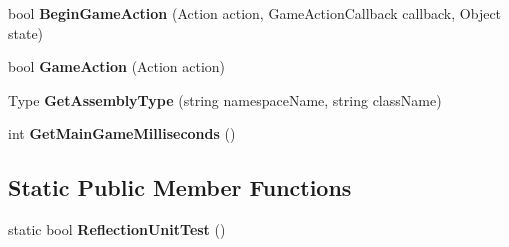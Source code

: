 \begin{DoxyCompactItemize}
\item 
\hypertarget{class_s_e_mod_a_p_i_internal_1_1_a_p_i_1_1_common_1_1_sandbox_game_assembly_wrapper_aa56ae68a14dca99d9b2aafce28ef18c2}{}bool {\bfseries Begin\+Game\+Action} (Action action, Game\+Action\+Callback callback, Object state)\label{class_s_e_mod_a_p_i_internal_1_1_a_p_i_1_1_common_1_1_sandbox_game_assembly_wrapper_aa56ae68a14dca99d9b2aafce28ef18c2}

\item 
\hypertarget{class_s_e_mod_a_p_i_internal_1_1_a_p_i_1_1_common_1_1_sandbox_game_assembly_wrapper_a29090e04998192f4edd88de83e7ea15f}{}bool {\bfseries Game\+Action} (Action action)\label{class_s_e_mod_a_p_i_internal_1_1_a_p_i_1_1_common_1_1_sandbox_game_assembly_wrapper_a29090e04998192f4edd88de83e7ea15f}

\item 
\hypertarget{class_s_e_mod_a_p_i_internal_1_1_a_p_i_1_1_common_1_1_sandbox_game_assembly_wrapper_acd1b94774b01ca0c9e6cd5db0c678cfb}{}Type {\bfseries Get\+Assembly\+Type} (string namespace\+Name, string class\+Name)\label{class_s_e_mod_a_p_i_internal_1_1_a_p_i_1_1_common_1_1_sandbox_game_assembly_wrapper_acd1b94774b01ca0c9e6cd5db0c678cfb}

\item 
\hypertarget{class_s_e_mod_a_p_i_internal_1_1_a_p_i_1_1_common_1_1_sandbox_game_assembly_wrapper_ac8b50e7d2eb82f7ff3211a25561bf294}{}int {\bfseries Get\+Main\+Game\+Milliseconds} ()\label{class_s_e_mod_a_p_i_internal_1_1_a_p_i_1_1_common_1_1_sandbox_game_assembly_wrapper_ac8b50e7d2eb82f7ff3211a25561bf294}

\end{DoxyCompactItemize}
\subsection*{Static Public Member Functions}
\begin{DoxyCompactItemize}
\item 
\hypertarget{class_s_e_mod_a_p_i_internal_1_1_a_p_i_1_1_common_1_1_sandbox_game_assembly_wrapper_ab3ac166b33d7ee9280c5ac891e1e41e4}{}static bool {\bfseries Reflection\+Unit\+Test} ()\label{class_s_e_mod_a_p_i_internal_1_1_a_p_i_1_1_common_1_1_sandbox_game_assembly_wrapper_ab3ac166b33d7ee9280c5ac891e1e41e4}

\end{DoxyCompactItemize}
